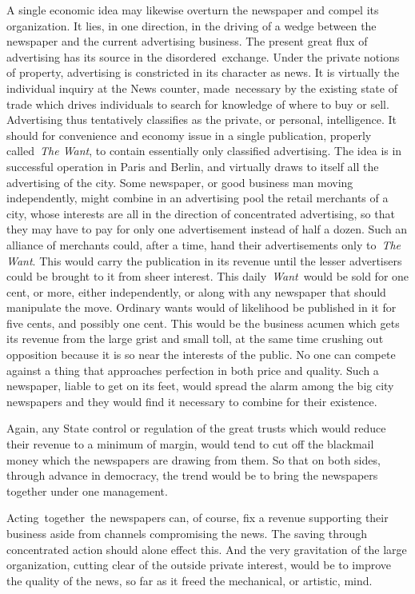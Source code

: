 \documentclass[twoside,symmetric,nobib,justified]{tufte-book}
\begin{document}
A single economic idea may likewise overturn the newspaper and compel
its organization. It lies, in one direction, in the driving of a wedge
between the newspaper and the current advertising business. The
present great flux of advertising has its source in the
disordered~exchange. Under the private notions of property, advertising
is constricted in its character as news. It is virtually the individual
inquiry at the News counter, made~necessary by the existing state of
trade which drives individuals to search for knowledge of where to buy
or sell. Advertising thus tentatively classifies as the private, or
personal, intelligence. It should for convenience and economy issue in a
single publication, properly called~\emph{The Want}, to contain
essentially only classified advertising. The idea is in successful
operation in Paris and Berlin, and virtually draws to itself all the
advertising of the city. Some newspaper, or good business man moving
independently, might combine in an advertising pool the retail merchants
of a city, whose interests are all in the direction of concentrated
advertising, so that they may have to pay for only one advertisement
instead of half a dozen. Such an alliance of merchants could, after a
time, hand their advertisements only to~\emph{The Want}. This would
carry the publication in its revenue until the lesser advertisers could
be brought to it from sheer interest. This daily~\emph{Want~}would be
sold for one cent, or more, either independently, or along with any
newspaper that should manipulate the move. Ordinary wants would of
likelihood be published in it for five cents, and possibly one cent.
This would be the business acumen which gets its revenue from the large
grist and small toll, at the same time crushing out opposition because
it is so near the interests of the public. No one can compete against a
thing that approaches perfection in both price and quality. Such a
newspaper, liable to get on its feet, would spread the alarm among the
big city newspapers and they would find it necessary to combine for
their existence.~

\enlargethispage{\baselineskip}

Again, any State control or regulation of the great trusts which would
reduce their revenue to a minimum of margin, would tend to cut off the
blackmail money which the newspapers are drawing from them. So that on
both sides, through advance in democracy, the trend would be to bring
the newspapers together under one management.~

Acting~together~the newspapers can, of course, fix a revenue supporting
their business aside from channels compromising the news. The saving
through concentrated action should alone effect this. And the very
gravitation of the large organization, cutting clear of the outside
private interest, would be to improve the quality of the news, so far as
it freed the mechanical, or artistic, mind.~
\end{document}
